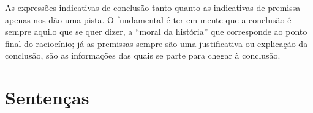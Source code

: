 
As expressões indicativas de conclusão tanto quanto as indicativas de premissa apenas nos dão uma pista.
O fundamental é ter em mente que a conclusão é sempre aquilo que se quer dizer, a ``moral da história'' que corresponde ao ponto final do raciocínio; já as premissas sempre são uma justificativa ou explicação da conclusão, são as informações das quais se parte para chegar à conclusão. 

\section{Sentenças}
\label{intro.sentences}


